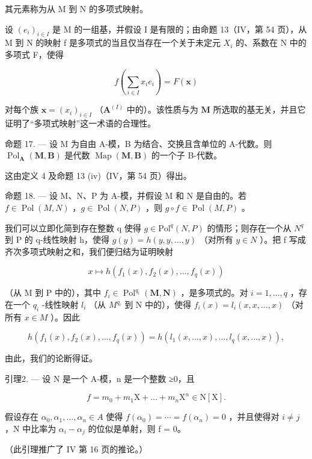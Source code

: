 其元素称为从 M 到 N 的多项式映射。

设 \((e_{i})_{i\in I}\) 是 M 的一组基，并假设 I 是有限的；由命题 13（IV，第 54 页），从 M 到 N 的映射 f 是多项式的当且仅当存在一个关于未定元 \(X_{i}\) 的、系数在 N 中的多项式 F，使得

\[
f \left(\sum_ {i \in I} x _ {i} e _ {i}\right) = F (\mathbf {x})
\]

对每个族 \(\mathbf{x} = (x_i)_{i\in I}\) （\(\mathbf{A}^{(I)}\) 中的）。该性质与为 \(\mathbf{M}\) 所选取的基无关，并且它证明了“多项式映射”这一术语的合理性。

命题 17. --- 设 M 为自由 A-模，B 为结合、交换且含单位的 A-代数。则 \(\operatorname{Pol}_{\mathbf{A}}(\mathbf{M}, \mathbf{B})\) 是代数 \(\operatorname{Map}(\mathbf{M}, \mathbf{B})\) 的一个子 B-代数。

这由定义 4 及命题 13 (iv)（IV，第 54 页）得出。

命题 18. --- 设 M、N、P 为 A-模，并假设 M 和 N 是自由的。若 \(f \in \operatorname{Pol}(M, N)\) ，\(g \in \operatorname{Pol}(N, P)\) ，则 \(g \circ f \in \operatorname{Pol}(M, P)\) 。

我们可以立即化简到存在整数 q 使得 \(g \in \text{Pol}^{q}(N, P)\) 的情形；则存在一个从 \(N^{q}\) 到 P 的 q-线性映射 h，使得 \(g(y) = h(y, y, \ldots, y)\) （对所有 \(y \in N\) ）。把 f 写成齐次多项式映射之和，我们便归结为证明映射

\[
x \mapsto h (f _ {1} (x), f _ {2} (x), \dots , f _ {q} (x))
\]

（从 M 到 P 中的），其中 \(f_{i} \in \operatorname{Pol}^{q_{i}}(\mathbf{M}, \mathbf{N})\) ，是多项式的。对 \(i = 1, \ldots, q\) ，存在一个 \(q_{i}\) -线性映射 \(l_{i}\) （从 \(M^{q_{i}}\) 到 N 中的），使得 \(f_{i}(x) = l_{i}(x, x, \ldots, x)\) （对所有 \(x \in M\) ）。因此

\[
h \left(f _ {1} (x), f _ {2} (x), \dots , f _ {q} (x)\right) = h \left(l _ {1} (x, \dots , x), \dots , l _ {q} (x, \dots , x)\right),
\]

由此，我们的论断得证。

引理2. --- 设 N 是一个 A-模，n 是一个整数 ≥0，且

\[
f = m _ {0} + m _ {1} \mathrm{X} + \dots + m _ {n} \mathrm{X} ^ {n} \in \mathrm{N} [ \mathrm{X} ].
\]

假设存在 \(\alpha_{0}, \alpha_{1}, \ldots, \alpha_{n} \in A\) 使得 \(f(\alpha_{0}) = \cdots = f(\alpha_{n}) = 0\) ，并且使得对 \(i \neq j\) ，N 中比率为 \(\alpha_{i} - \alpha_{j}\) 的位似是单射，则 f = 0。

（此引理推广了 IV 第 16 页的推论。）

